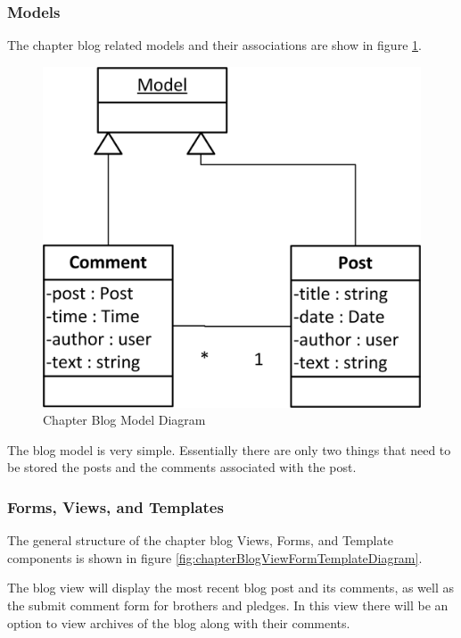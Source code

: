 \documentclass{article}
\begin{document}
\subsubsection{Models}

The chapter blog related models and their associations are show in figure \ref{fig:blogModelDiagram}.

\FloatBarrier
\begin{figure}[h!]
\centering
\includegraphics[scale=.65]{img/modelDiagrams/blogModel}
\caption{Chapter Blog Model Diagram}
\label{fig:blogModelDiagram}
\end{figure}
\FloatBarrier

The blog model is very simple. Essentially there are only two things that need to be stored the posts and the comments associated with the post.

\subsubsection{Forms, Views, and Templates}

The general structure of the chapter blog Views, Forms, and Template components is shown in figure \ref{fig:chapterBlogViewFormTemplateDiagram}.

The blog view will display the most recent blog post and its comments, as well as the submit comment form for brothers and pledges. In this view there will be an option to view archives of the blog along with their comments.
\end{document}
